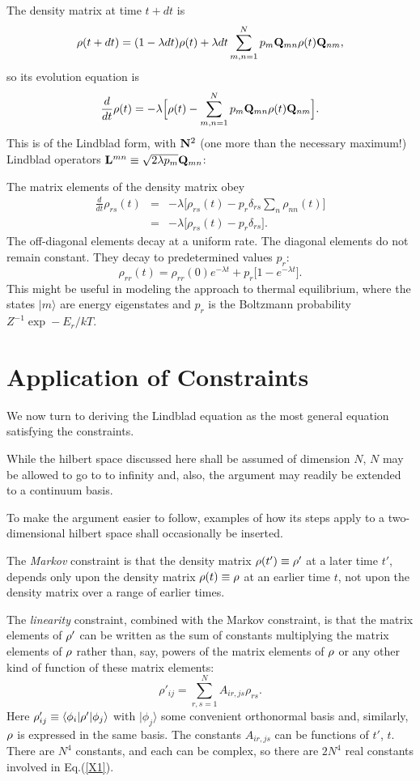 \documentclass[aps,pra,twocolumn,amssymb, amsfonts,amsmath,showpacs, superscriptaddress]{revtex4}
\begin{document}
The density matrix at time $t+dt$ is
\[
{\bf \rho}(t+dt)=(1-\lambda dt){\bf \rho}(t)+\lambda dt\sum_{m,n=1}^{N}p_{m}{\bf Q}_{mn} {\bf \rho}(t){\bf Q}_{nm}, 
\]
\noindent so its evolution equation is 
\[
\frac{d}{dt}{\bf \rho}(t)=-\lambda\Big[{\bf \rho}(t)-\sum_{m,n=1}^{N}p_{m}{\bf Q}_{mn} {\bf \rho}(t){\bf Q}_{nm}\Big].
\]
\noindent This is of the Lindblad form, with ${\bf N}^{2}$ (one more than the necessary maximum!) Lindblad operators 
${\bf L}^{mn}\equiv\sqrt{2\lambda p_{m}}{\bf Q}_{mn}$: 

The matrix elements of the density matrix obey
\begin{eqnarray}
\frac{d}{dt} \rho_{rs}(t)&=&-\lambda\Big[ \rho_{rs}(t)-p_{r}\delta_{rs}\sum_{n}\rho_{nn}(t)\Big]\nonumber\\
&=&-\lambda\Big[ \rho_{rs}(t)-p_{r}\delta_{rs}\Big].\nonumber
\end{eqnarray}
\noindent The off-diagonal elements decay at a uniform rate.  The diagonal elements do not remain constant. They decay to predetermined values $p_{r}$:
\[
\rho_{rr}(t)=\rho_{rr}(0)e^{-\lambda t}+p_{r}\Big[1-e^{-\lambda t}\Big].
\]
This might be useful in modeling the  approach to thermal equilibrium, where the states $|m\rangle$ are energy eigenstates and $p_{r}$ is the Boltzmann probability $Z^{-1}\exp-E_{r}/kT$.
 

  \section{Application of Constraints} 
 
 We now turn to deriving the Lindblad equation as the most general equation satisfying the constraints.  
 
 While the hilbert space discussed here shall 
 be assumed of dimension $N$,  $N$ may be allowed to go to to infinity and, also, the argument may readily be extended to a continuum basis. 
 
To make the argument  
easier to follow,  examples of how its steps apply to a two-dimensional hilbert space shall occasionally be inserted.  
 
 The  \textit{Markov} constraint is that the density matrix ${\bf\rho}(t')\equiv{\bf\rho}'$ at a later time $t'$,  depends only upon the density matrix ${\bf\rho}(t)\equiv{\bf\rho}$ at an earlier time $t$,  not upon the density matrix over a range of earlier times. 
 
The \textit{linearity} constraint, combined with the Markov constraint, is that the matrix elements of ${\bf\rho}'$ can be written as the sum of constants multiplying the matrix elements of ${\bf\rho}$  rather than, say, powers of the matrix elements of ${\bf\rho}$ or any other kind of function of these matrix elements: 
 \begin{equation}\label{X1}
\rho'_{ij}=\sum_{r,s=1}^{N}A_{ir,js}\rho_{rs}.  
\end{equation}
\noindent  Here $\rho'_{ij}\equiv\langle\phi_{i}|{\bf\rho}' |\phi_{j}\rangle$  with $ |\phi_{j}\rangle$  some convenient orthonormal basis and,  similarly, ${\bf\rho}$ is expressed in the same basis.  The constants $A_{ir,js}$ can be functions of $t'$, $t$. There are $N^{4}$ constants, and each can be complex, so there are $2N^{4}$ real constants involved 
in Eq.(\ref{X1}). 
\end{document}
